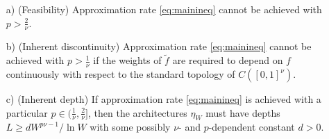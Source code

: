 \documentclass[final, 12pt]{colt2018}
\begin{document}
\begin{theorem}\label{th:2}{}\hfill
\begin{enumerate}
\item[a)] (Feasibility) Approximation rate \eqref{eq:mainineq} cannot be achieved with $p>\frac{2}{\nu}$.
\item[b)] (Inherent discontinuity) Approximation rate \eqref{eq:mainineq} cannot be achieved with $p>\frac{1}{\nu}$ if the weights of $\widetilde f$ are required to depend on $f$ continuously with respect to the standard topology of $C([0,1]^\nu)$.
\item[c)] (Inherent depth) If approximation rate \eqref{eq:mainineq} is achieved with a particular $p\in (\frac{1}{\nu},\frac{2}{\nu}]$, then the architectures $\eta_W$ must have depths $L\ge d W^{p\nu-1}/\ln W$  with some possibly $\nu$- and $p$-dependent constant $d>0.$
\end{enumerate}
\end{theorem}
\end{document}
